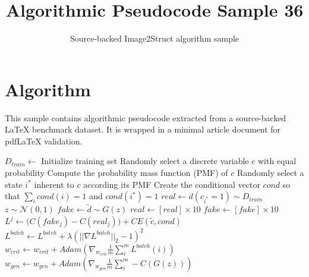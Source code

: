 \documentclass[11pt]{article}
\title{Algorithmic Pseudocode Sample 36}
\author{Source-backed Image2Struct algorithm sample}
\date{}
\begin{document}
\maketitle
\section{Algorithm}
This sample contains algorithmic pseudocode extracted from a source-backed LaTeX benchmark dataset. It is wrapped in a minimal article document for pdfLaTeX validation.

\begin{algorithm}[htbp]
\caption{Source-backed algorithmic procedure}
\begin{algorithm}
\caption{Training GANs-based auction features generator}
\begin{algorithmic}[1]
\State $D_{train} \gets$ Initialize training set
 
\State Randomly select a discrete variable $c$ with equal probability
\State Compute the probability mass function (PMF) of $c$
\State Randomly select a state $i^*$ inherent to $c$ according its PMF
\State Create the conditional vector $cond$ so that $\sum_i cond(i) = 1$ and $cond(i^*)=1$
 
\State $real \gets d(c_{i^*}=1)\sim D_{train}$ 
\State $z \sim \mathcal{N}(0,1)$ 
\State $fake \gets \tilde{d} \sim G(z)$ 
\State $real \gets [real]\times 10$ 
\State $fake \gets [fake] \times 10$
\State $L^j \gets \big( C(fake_j) - C(real_j)\big) + CE(\tilde{c}, cond)$
\State $L^{batch} \gets L^{batch} + \lambda(||\nabla L^{batch} ||_{2} - 1)^2$ 
\State $w_{crit} \gets w_{crit} + Adam(\nabla_{w_{crit}}\frac{1}{m}\sum_i^m L^{batch}(i))$ 
 
\State $w_{gen} \gets w_{gen} + Adam(\nabla_{w_{gen}}\frac{1}{m}\sum_i^m -C(G(z)))$ 
\EndIf
\EndFor
\EndWhile
\end{algorithmic}
\end{algorithm}
\end{algorithm}
\end{document}
